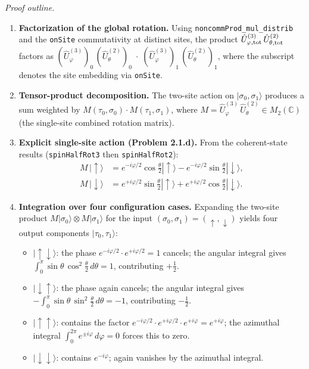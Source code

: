 \documentclass[a4paper,11pt]{article}
\begin{document}
\begin{itemize}
  \textit{Proof outline.}
  \begin{enumerate}
  \item \textbf{Factorization of the global rotation.}
    Using \texttt{noncommProd\_mul\_distrib} and the \texttt{onSite}
    commutativity at distinct sites, the product
    $\hat U^{(3)}_{\varphi,{\rm tot}}\,\hat U^{(2)}_{\theta,{\rm tot}}$
    factors as
    $(\hat U^{(3)}_\varphi)_0\,(\hat U^{(2)}_\theta)_0\;
     \cdot\;
     (\hat U^{(3)}_\varphi)_1\,(\hat U^{(2)}_\theta)_1$,
    where the subscript denotes the site embedding via \texttt{onSite}.

  \item \textbf{Tensor-product decomposition.}
    The two-site action on $|\sigma_0,\sigma_1\rangle$ produces
    a sum weighted by $M(\tau_0,\sigma_0)\cdot M(\tau_1,\sigma_1)$,
    where $M = \hat U^{(3)}_\varphi\,\hat U^{(2)}_\theta \in M_2(\mathbb{C})$
    (the single-site combined rotation matrix).

  \item \textbf{Explicit single-site action (Problem 2.1.d).}
    From the coherent-state results (\texttt{spinHalfRot3} then
    \texttt{spinHalfRot2}):
    \begin{align*}
      M\,|\!\uparrow\rangle &=
        e^{-i\varphi/2}\cos\tfrac{\theta}{2}|\!\uparrow\rangle
        - e^{-i\varphi/2}\sin\tfrac{\theta}{2}|\!\downarrow\rangle,\\
      M\,|\!\downarrow\rangle &=
        e^{+i\varphi/2}\sin\tfrac{\theta}{2}|\!\uparrow\rangle
        + e^{+i\varphi/2}\cos\tfrac{\theta}{2}|\!\downarrow\rangle.
    \end{align*}

  \item \textbf{Integration over four configuration cases.}
    Expanding the two-site product $M|\sigma_0\rangle\otimes M|\sigma_1\rangle$
    for the input $(\sigma_0,\sigma_1)=(\uparrow,\downarrow)$ yields
    four output components $|\tau_0,\tau_1\rangle$:
    \begin{itemize}
      \item $|\!\uparrow\downarrow\rangle$: the phase $e^{-i\varphi/2}
        \cdot e^{+i\varphi/2} = 1$ cancels; the angular integral gives
        $\int_0^\pi \sin\theta\,\cos^2\!\tfrac{\theta}{2}\,d\theta = 1$,
        contributing $+\tfrac{1}{2}$.
      \item $|\!\downarrow\uparrow\rangle$: the phase again cancels;
        the angular integral gives
        $-\int_0^\pi \sin\theta\,\sin^2\!\tfrac{\theta}{2}\,d\theta = -1$,
        contributing $-\tfrac{1}{2}$.
      \item $|\!\uparrow\uparrow\rangle$: contains the factor
        $e^{-i\varphi/2}\cdot e^{+i\varphi/2}\cdot e^{+i\varphi}
         = e^{+i\varphi}$; the azimuthal integral
        $\int_0^{2\pi}e^{\pm i\varphi}\,d\varphi = 0$ forces this to zero.
      \item $|\!\downarrow\downarrow\rangle$: contains $e^{-i\varphi}$;
        again vanishes by the azimuthal integral.
    \end{itemize}


\end{enumerate}
\end{itemize}
\end{document}
